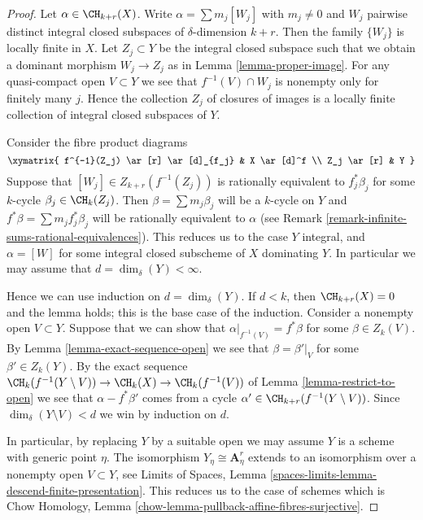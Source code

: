 \begin{proof}
Let $\alpha \in \CH_{k + r}(X)$. Write $\alpha = \sum m_j[W_j]$ with
$m_j \not = 0$ and $W_j$ pairwise distinct integral closed subspaces of
$\delta$-dimension $k + r$. Then the family $\{W_j\}$
is locally finite in $X$. Let $Z_j \subset Y$ be the integral
closed subspace such that we obtain a dominant morphism $W_j \to Z_j$
as in Lemma \ref{lemma-proper-image}. For any quasi-compact open
$V \subset Y$ we see that $f^{-1}(V) \cap W_j$
is nonempty only for finitely many $j$. Hence the
collection $Z_j$ of closures of images is a locally finite collection
of integral closed subspaces of $Y$.

\medskip\noindent
Consider the fibre product diagrams
$$
\xymatrix{
f^{-1}(Z_j) \ar[r] \ar[d]_{f_j} & X \ar[d]^f \\
Z_j \ar[r] & Y
}
$$
Suppose that $[W_j] \in Z_{k + r}(f^{-1}(Z_j))$
is rationally equivalent to $f_j^*\beta_j$ for some
$k$-cycle $\beta_j \in \CH_k(Z_j)$. Then
$\beta = \sum m_j \beta_j$ will be a $k$-cycle on $Y$
and $f^*\beta = \sum m_j f_j^*\beta_j$ will be rationally
equivalent to $\alpha$ (see
Remark \ref{remark-infinite-sums-rational-equivalences}).
This reduces us to the case $Y$ integral, and
$\alpha = [W]$ for some integral closed subscheme
of $X$ dominating $Y$. In particular we may
assume that $d = \dim_\delta(Y) < \infty$.

\medskip\noindent
Hence we can use induction on $d = \dim_\delta(Y)$.
If $d < k$, then $\CH_{k + r}(X) = 0$ and the lemma holds;
this is the base case of the induction.
Consider a nonempty open $V \subset Y$.
Suppose that we can show that $\alpha|_{f^{-1}(V)} = f^*\beta$
for some $\beta \in Z_k(V)$. By Lemma \ref{lemma-exact-sequence-open}
we see that
$\beta = \beta'|_V$ for some $\beta' \in Z_k(Y)$.
By the exact sequence
$\CH_k(f^{-1}(Y \setminus V)) \to \CH_k(X) \to \CH_k(f^{-1}(V))$
of Lemma \ref{lemma-restrict-to-open}
we see that $\alpha - f^*\beta'$ comes from
a cycle $\alpha' \in \CH_{k + r}(f^{-1}(Y \setminus V))$.
Since $\dim_\delta(Y \setminus V) < d$ we win by
induction on $d$.

\medskip\noindent
In particular, by replacing $Y$ by a suitable open we may assume
$Y$ is a scheme with generic point $\eta$. The isomorphism
$Y_\eta \cong \mathbf{A}^r_\eta$ extends to an isomorphism
over a nonempty open $V \subset Y$, see
Limits of Spaces, Lemma \ref{spaces-limits-lemma-descend-finite-presentation}.
This reduces us to the case of schemes which is
Chow Homology, Lemma \ref{chow-lemma-pullback-affine-fibres-surjective}.
\end{proof}

